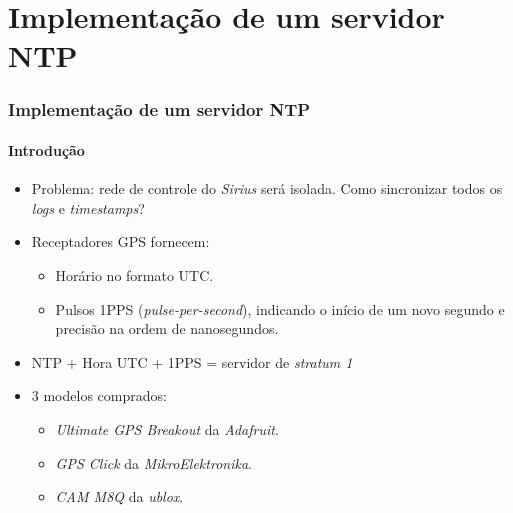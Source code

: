 \section {Implementação de um servidor NTP}


\begin{frame}
\frametitle{Implementação de um servidor NTP}
\framesubtitle{Introdução}

\begin{itemize}
  \item Problema: rede de controle do \textit{Sirius} será isolada. Como
  sincronizar todos os \textit{logs} e \textit{timestamps}?
  \item Receptadores GPS fornecem:
  \begin{itemize}
    \item Horário no formato UTC.
    \item Pulsos 1PPS (\textit{pulse-per-second}), indicando o início de um novo
    segundo e precisão na ordem de nanosegundos.
  \end{itemize}
  \item NTP + Hora UTC + 1PPS = servidor de \textit{stratum 1}
  
  \item 3 modelos comprados:
  \begin{itemize}
    \item \textit{Ultimate GPS Breakout} da \textit{Adafruit}.
    \item \textit{GPS Click} da \textit{MikroElektronika}. 
    \item \textit{CAM M8Q} da \textit{ublox}.
  \end{itemize} 
\end{itemize}

\end{frame}

